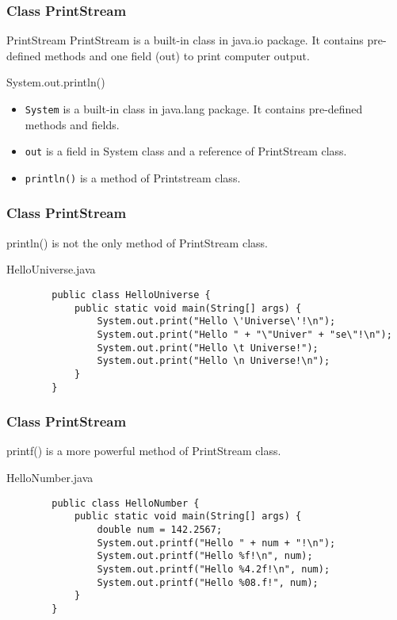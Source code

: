 \documentclass[10pt, compress]{beamer}
\begin{document}
\begin{frame}[fragile]
	\frametitle{Class PrintStream}
	\begin{block}{PrintStream}
		PrintStream is a built-in class in java.io package. It contains pre-defined methods and one field (out) to print computer output.
	\end{block}
	\begin{block}{System.out.println()}
		\begin{itemize}
			\item[] \texttt{System} is a built-in class in java.lang package. It contains pre-defined methods and fields.
			\item[] \texttt{out} is a field in System class and a reference of PrintStream class.
			\item[] \texttt{println()} is a method of Printstream class.
		\end{itemize}
	\end{block}
\end{frame}

\begin{frame}[fragile]
	\frametitle{Class PrintStream}
	println() is not the only method of PrintStream class.
	\begin{block}{HelloUniverse.java}
	\begin{verbatim}
		public class HelloUniverse {
		    public static void main(String[] args) {
		        System.out.print("Hello \'Universe\'!\n");
		        System.out.print("Hello " + "\"Univer" + "se\"!\n");
		        System.out.print("Hello \t Universe!");
		        System.out.print("Hello \n Universe!\n");
		    }
		}
	\end{verbatim}
	\end{block}
\end{frame}

\begin{frame}[fragile]
	\frametitle{Class PrintStream}
	printf() is a more powerful method of PrintStream class.
	\begin{block}{HelloNumber.java}
	\begin{verbatim}
		public class HelloNumber {
		    public static void main(String[] args) {
		        double num = 142.2567;
		        System.out.printf("Hello " + num + "!\n");
		        System.out.printf("Hello %f!\n", num);
		        System.out.printf("Hello %4.2f!\n", num);
		        System.out.printf("Hello %08.f!", num);
		    }
		}
	\end{verbatim}
	\end{block}
\end{frame}
\end{document}
